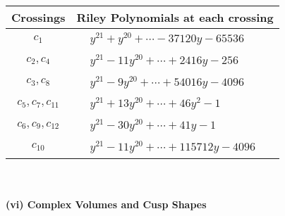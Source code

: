 \documentclass[1p]{elsarticle_modified}
\theoremstyle{definition}
\begin{document}
\begin{tabular}{m{50pt}|m{274pt}}
Crossings & \hspace{64pt}Riley Polynomials at each crossing \\
\hline $$\begin{aligned}c_{1}\end{aligned}$$&$\begin{aligned}
&y^{21}+y^{20}+\cdots-37120 y-65536
\end{aligned}$\\
\hline $$\begin{aligned}c_{2},c_{4}\end{aligned}$$&$\begin{aligned}
&y^{21}-11 y^{20}+\cdots+2416 y-256
\end{aligned}$\\
\hline $$\begin{aligned}c_{3},c_{8}\end{aligned}$$&$\begin{aligned}
&y^{21}-9 y^{20}+\cdots+54016 y-4096
\end{aligned}$\\
\hline $$\begin{aligned}c_{5},c_{7},c_{11}\end{aligned}$$&$\begin{aligned}
&y^{21}+13 y^{20}+\cdots+46 y^2-1
\end{aligned}$\\
\hline $$\begin{aligned}c_{6},c_{9},c_{12}\end{aligned}$$&$\begin{aligned}
&y^{21}-30 y^{20}+\cdots+41 y-1
\end{aligned}$\\
\hline $$\begin{aligned}c_{10}\end{aligned}$$&$\begin{aligned}
&y^{21}-11 y^{20}+\cdots+115712 y-4096
\end{aligned}$\\
\hline
\end{tabular}\\~\\
\newpage\flushleft \textbf{(vi) Complex Volumes and Cusp Shapes}
\end{document}

